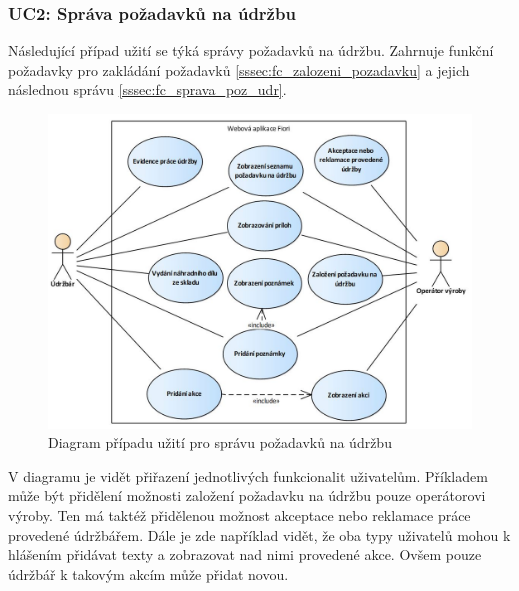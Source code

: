 \documentclass[thesis=M,czech]{FITthesis}[2012/06/26]
\begin{document}
\subsubsection{UC2: Správa požadavků na údržbu}
\label{sssec:uc_sprava_udrzby}
Následující případ užití se týká správy požadavků na údržbu. Zahrnuje funkční požadavky pro zakládání požadavků \ref{sssec:fc_zalozeni_pozadavku} a jejich následnou správu \ref{sssec:fc_sprava_poz_udr}.
\begin{figure}[H]
	\centering
	\includegraphics[width=1\textwidth]{images/ea_sprava_udrzby}
	\caption{Diagram případu užití pro správu požadavků na údržbu}
	\label{img:uc_pozadavky}
\end{figure}
V diagramu je vidět přiřazení jednotlivých funkcionalit uživatelům. Příkladem může být přidělení možnosti založení požadavku na údržbu pouze operátorovi výroby. Ten má taktéž přidělenou možnost akceptace nebo reklamace práce provedené údržbářem. Dále je zde například vidět, že oba typy uživatelů mohou k hlášením přidávat texty a zobrazovat nad nimi provedené akce. Ovšem pouze údržbář k takovým akcím může přidat novou. 
\end{document}

